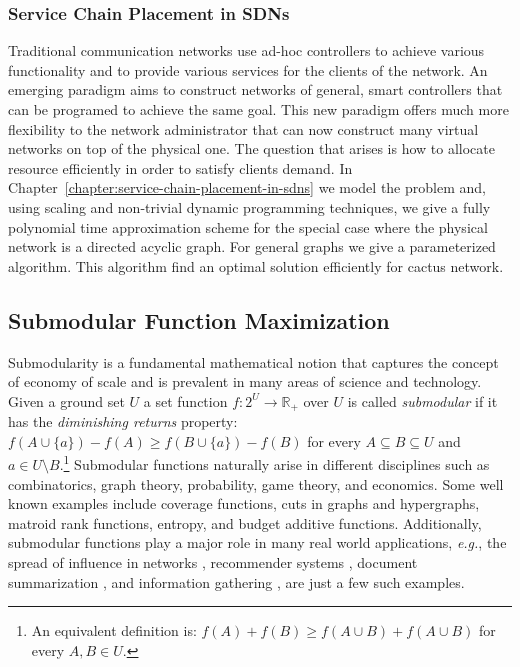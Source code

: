 \subsubsection*{Service Chain Placement in SDNs} 
Traditional communication networks use ad-hoc controllers to achieve various functionality and to provide various services for the clients of the network.
An emerging paradigm aims to construct networks of general, smart controllers that can be programed to achieve the same goal. 
This new paradigm offers much more flexibility to the network administrator that can now construct many virtual networks on top of the physical one.
The question that arises is how to allocate resource efficiently in order to satisfy clients demand.
In Chapter~\ref{chapter:service-chain-placement-in-sdns} we model the problem and, using scaling and non-trivial dynamic programming techniques, we give a fully polynomial time approximation scheme for the special case where the physical network is a directed acyclic graph. 
For general graphs we give a parameterized algorithm.
This algorithm find an optimal solution efficiently for cactus network.

\subsection*{Submodular Function Maximization}
Submodularity is a fundamental mathematical notion that captures the concept of economy of scale and is prevalent in many areas of science and technology.
Given a ground set $U$ a set function $f:2^U \to \mathbb{R}_+$ over $U$ is called \emph{submodular} if it has the \emph{diminishing returns} property:
$f(A \cup \{a\}) - f(A) \geq f(B \cup \{a\}) - f(B)$ for every $A \subseteq B \subseteq U$ and $a \in U \setminus B$.\footnote{
    An equivalent definition is: $f(A) + f(B) \geq f(A \cup B) + f(A \cup B)$ for every $A,B \in U$.
}
Submodular functions naturally arise in different disciplines such as combinatorics, graph theory, probability, game theory, and economics.
Some well known examples include coverage functions, cuts in graphs and hypergraphs, matroid rank functions, entropy, and budget additive functions.
Additionally, submodular functions play a major role in many real world applications, {\em e.g.}, the spread of influence in networks \cite{KKT03,KKT05,KKT15,MR10}, recommender systems \cite{EG11,EVSG09}, document summarization \cite{DKR13,LB10,LB11}, and information gathering \cite{GKS05,KG11,KGGK06,KGGK11,KSG08}, are just a few such examples.

